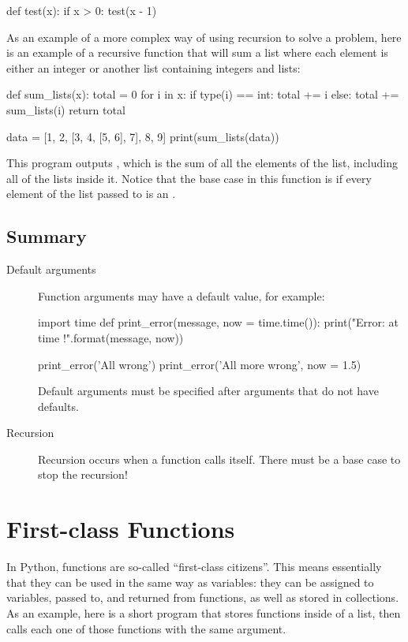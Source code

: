 \documentclass[11pt]{cselabheader}
\begin{document}
\begin{python3code}
def test(x):
    if x > 0:
        test(x - 1)
\end{python3code}

As an example of a more complex way of using recursion to solve a problem, here
is an example of a recursive function that will sum a list where each element is
either an integer or another list containing integers and lists:

\begin{python3code}
def sum_lists(x):
    total = 0
    for i in x:
        if type(i) == int:
            total += i
        else:
            total += sum_lists(i)
    return total

data = [1, 2, [3, 4, [5, 6], 7], 8, 9]
print(sum_lists(data))
\end{python3code}

This program outputs , which is the sum of all the elements of the
list, including all of the lists inside it. Notice that the base case in this
function is if every element of the list passed to  is an
.

\subsection{Summary}

\begin{description}
\item[Default arguments] Function arguments may have a default value, for
    example:
    \begin{python3code}
import time
def print_error(message, now = time.time()):
  print("Error: {} at time {}!".format(message, now))

print_error('All wrong')
print_error('All more wrong', now = 1.5)
    \end{python3code}

    Default arguments must be specified after arguments that do not have
    defaults.

  \item[Recursion] Recursion occurs when a function calls itself. There must be
    a base case to stop the recursion!
\end{description}

\pagebreak
\section{First-class Functions}
\label{subsec:first}
In Python, functions are so-called ``first-class citizens''. This means
essentially that they can be used in the same way as variables: they can be
assigned to variables, passed to, and returned from functions, as well as stored
in collections. As an example, here is a short program that stores functions
inside of a list, then calls each one of those functions with the same argument.
\end{document}

